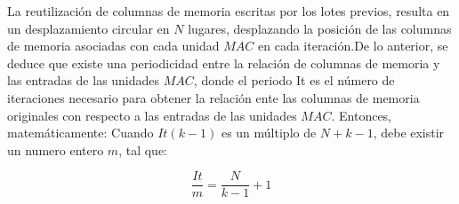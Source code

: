 \documentclass[a4paper]{article}
\begin{document}
La reutilización de columnas de memoria escritas por los lotes previos, resulta en un desplazamiento circular en $N$ lugares, desplazando la posición de las columnas de memoria asociadas con cada unidad $MAC$ en cada iteración.De lo anterior, se deduce que existe una periodicidad entre la relación de columnas de memoria y las entradas de las unidades $MAC$, donde el periodo It es el número de iteraciones necesario para obtener la relación ente las columnas de memoria originales con respecto a las entradas de las unidades $MAC$.
Entonces, matemáticamente: Cuando $It(k-1)$ es un múltiplo de $N+k-1$, debe existir un numero entero $m$, tal que:

\begin{equation}\label{niter}
  \frac{It}{m} = \frac{N}{k-1} + 1
\end{equation}
\end{document}
